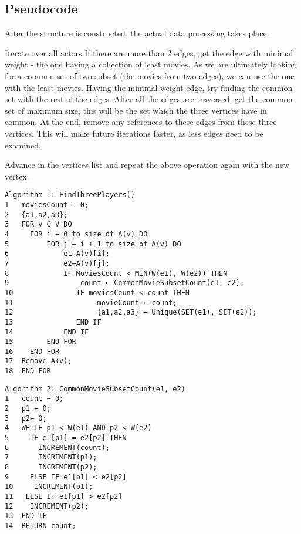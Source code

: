 \subsection{Pseudocode}

After the structure is constructed, the actual data processing takes place.

Iterate over all actors
If there are more than 2 edges, get the edge with minimal weight - the one having a collection of least movies. As we are ultimately looking for a common set of two subset (the movies from two edges), we can use the one with the least movies.
Having the minimal weight edge, try finding the common set with the rest of the edges. After all the edges are traversed, get the common set of maximum size, this will be the set which the three vertices have in common. At the end, remove any references to these edges from these three vertices. This will make future iterations faster, as less edges need to be examined.

Advance in the vertices list and repeat the above operation again with the new vertex.

\begin{verbatim}
Algorithm 1: FindThreePlayers()
1	moviesCount ← 0;
2	{a1,a2,a3};
3	FOR v ∈ V DO
4	  FOR i ← 0 to size of A(v) DO
5	      FOR j ← i + 1 to size of A(v) DO
6	          e1←A(v)[i];
7	          e2←A(v)[j];
8	          IF MoviesCount < MIN(W(e1), W(e2)) THEN
9	              count ← CommonMovieSubsetCount(e1, e2);
10	             IF moviesCount < count THEN
11	                  movieCount ← count;
12	                  {a1,a2,a3} ← Unique(SET(e1), SET(e2));
13	             END IF
14	          END IF
15	      END FOR
16	  END FOR
17	Remove A(v);
18	END FOR	  	                    	  
\end{verbatim}

\begin{verbatim}
Algorithm 2: CommonMovieSubsetCount(e1, e2)
1	count ← 0;
2	p1 ← 0;
3	p2← 0;
4	WHILE p1 < W(e1) AND p2 < W(e2)
5	  IF e1[p1] = e2[p2] THEN
6	    INCREMENT(count);
7	    INCREMENT(p1);
8	    INCREMENT(p2);
9	  ELSE IF e1[p1] < e2[p2]
10	   INCREMENT(p1);
11	 ELSE IF e1[p1] > e2[p2]
12	  INCREMENT(p2);
13	END IF
14	RETURN count;
\end{verbatim}
